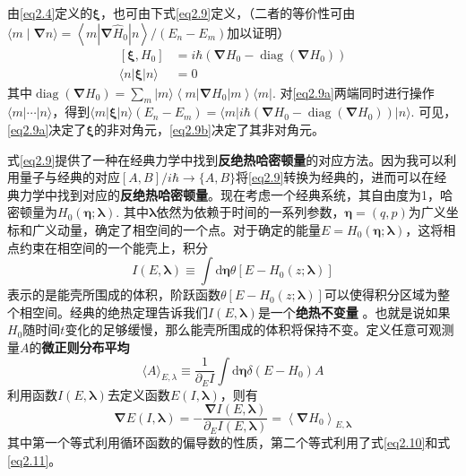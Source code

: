 由\eqref{eq2.4}定义的$\bm{\xi}$，也可由下式\eqref{eq2.9}定义，（二者的等价性可由$\langle m \mid \boldsymbol{\nabla} n\rangle=\left\langle m\left|\boldsymbol{\nabla} \hat{H}_{0}\right| n\right\rangle /\left(E_{n}-E_{m}\right)$\cite{Berry2009}加以证明）
\begin{subequations}
    \begin{align}
        \left[ \boldsymbol{\xi}, H_{0} \right] &= i \hbar \left( \boldsymbol{\nabla} H_{0}-\operatorname{diag} \left(\boldsymbol{\nabla} H_{0} \right) \right) \label{eq2.9a}\\
        \langle n|\boldsymbol{\xi}| n\rangle &= 0 \label{eq2.9b}
    \end{align}
    \label{eq2.9}
\end{subequations}
其中$\operatorname{diag}\left(\boldsymbol{\nabla} H_{0}\right)=\sum_{m}|m\rangle\left\langle m\left|\boldsymbol{\nabla} H_{0}\right| m\right\rangle\langle m|.$ 对\eqref{eq2.9a}两端同时进行操作$\langle m|\cdots| n\rangle$，得到$\langle m| \boldsymbol{\xi} | n\rangle (E_n - E_m) = \langle m|i \hbar \left( \boldsymbol{\nabla} H_{0}-\operatorname{diag} \left(\boldsymbol{\nabla} H_{0} \right) \right)| n\rangle$. 可见，\eqref{eq2.9a}决定了$\boldsymbol{\xi}$的非对角元，\eqref{eq2.9b}决定了其非对角元。

式\eqref{eq2.9}提供了一种在经典力学中找到\textbf{反绝热哈密顿量}的对应方法。因为我可以利用量子与经典的对应$[A, B]/i \hbar \to \{A, B\}  $将\eqref{eq2.9}转换为经典的，进而可以在经典力学中找到对应的\textbf{反绝热哈密顿量}。现在考虑一个经典系统，其自由度为1，哈密顿量为$H_0 (\bm{\eta};\bm{\lambda}).$ 其中$\bm{\lambda}$依然为依赖于时间的一系列参数，$\bm{\eta}=(q,p)$为广义坐标和广义动量，确定了相空间的一个点。对于确定的能量$E = H_0 (\bm{\eta};\bm{\lambda})$，这将相点约束在相空间的一个能壳上，积分
\begin{equation}
    I(E, \boldsymbol{\lambda}) \equiv \int \mathrm{d} \bm{\eta} \theta\left[E-H_{0}(z ; \boldsymbol{\lambda})\right]
  \label{eq2.10}
\end{equation}
表示的是能壳所围成的体积，阶跃函数$\theta\left[E-H_{0}(z ; \boldsymbol{\lambda})\right]$可以使得积分区域为整个相空间。经典的绝热定理告诉我们$I(E, \boldsymbol{\lambda})$是一个\textbf{绝热不变量} \cite{LiuChuan2019}。也就是说如果$H_0$随时间$t$变化的足够缓慢，那么能壳所围成的体积将保持不变。定义任意可观测量$A$的\textbf{微正则分布平均}
\begin{equation}
    \langle A \rangle_{E, \lambda} \equiv \frac{1}{\partial_{E} I} \int \mathrm{d} \bm{\eta} \delta\left(E-H_{0}\right) A
  \label{eq2.11}
\end{equation}
利用函数$I (E,\bm{\lambda})$去定义函数$E (I, \bm{\lambda})$，则有
\begin{equation}
    \boldsymbol{\nabla} E(I, \boldsymbol{\lambda})=-\frac{\boldsymbol{\nabla} I(E, \boldsymbol{\lambda})}{\partial_{E} I(E, \boldsymbol{\lambda})}=\left\langle\boldsymbol{\nabla} H_{0}\right\rangle_{E, \boldsymbol{\lambda}}
  \label{eq2.12}
\end{equation}
其中第一个等式利用循环函数的偏导数的性质，第二个等式利用了式\eqref{eq2.10}和式\eqref{eq2.11}。

